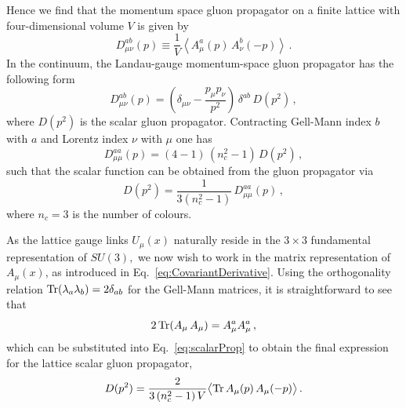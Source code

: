 Hence we find that the momentum space gluon propagator on a finite lattice with four-dimensional volume $V$ is given by
%
\begin{equation}
D_{\mu\nu}^{ab}(p) \equiv \frac{1}{V}\left \langle A^a_\mu (p)\,A^b_\nu(-p)\right\rangle \, . \label{eq:gluonProp}
\end{equation}
%
In the continuum, the Landau-gauge momentum-space gluon propagator has the following form~\cite{Leinweber:1998im,Bonnet:2001uh}
%
\begin{equation}
D^{ab}_{\mu\nu}(p) = \left ( \delta_{\mu\nu} - \frac{p_\mu p_\nu}{p^2} \right )\,\delta^{ab}\,D(p^2) \, ,
\end{equation}
%
where $D(p^2)$ is the scalar gluon propagator.  Contracting Gell-Mann index $b$ with $a$ and
Lorentz index $\nu$ with $\mu$ one has
%
\begin{equation}
D^{aa}_{\mu\mu}(p) = (4-1)\,(n_c^2-1)\,D(p^2) \, ,
\end{equation}
%
such that the scalar function can be obtained from the gluon propagator via
%
\begin{equation}
D(p^2) = \frac{1}{3(n_c^2-1)}\,D^{aa}_{\mu\mu}(p) \, ,
\label{eq:scalarProp}
\end{equation}
%
where $n_c = 3$ is the number of colours.

As the lattice gauge links $U_\mu(x)$ naturally reside in the $3\times 3$ fundamental representation of $SU(3),$ we now wish to work in the matrix representation of $A_\mu(x)$, as introduced in Eq.~\eqref{eq:CovariantDerivative}. Using the orthogonality relation $\operatorname{Tr}(\lambda_a\lambda_b) = 2\delta_{ab}$ for the Gell-Mann matrices, it is straightforward to see that
%
\begin{equation}
2\operatorname{Tr}(A_\mu\,A_\mu) = A^a_\mu A^a_\mu\, ,
\end{equation}
%
which can be substituted into Eq.~\eqref{eq:scalarProp} to obtain the final expression for the lattice scalar gluon propagator,
%
\begin{equation}
D(p^2) = \frac{2}{3\,(n_c^2-1)\,V}\big\langle {\rm Tr}\, A_\mu(p)\,A_\mu(-p) \big\rangle \,. \label{eq:scalarProp2}
\end{equation}

